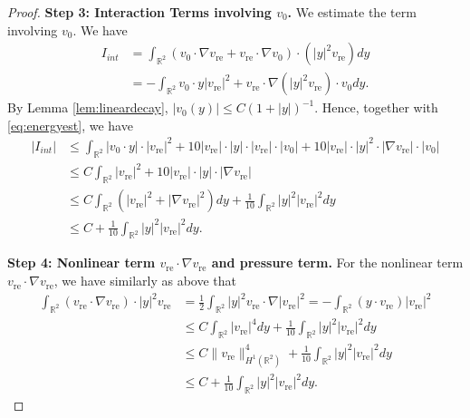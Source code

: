 \documentclass[12pt]{amsart}
\numberwithin{equation}{section}              %
\theoremstyle{remark}
\begin{document}
\begin{proof}
			\textbf{Step 3: Interaction Terms involving $v_0$.}
			We estimate the term involving $v_0$.   We have
			\begin{equation*}
				\begin{aligned}
					I_{int} &= \int_{\mathbb{R}^2} (v_0\cdot\nabla v_{\text{re}} + v_{\text{re}} \cdot \nabla v_0) \cdot (|y|^2 v_{\text{re}}) dy\\
					&= -\int_{\mathbb{R}^2} v_0\cdot y|v_{\text{re}}|^2+v_{\text{re}}\cdot\nabla (|y|^2v_{\text{re}})\cdot v_0 dy.
				\end{aligned}
			\end{equation*}
			By Lemma \ref{lem:lineardecay}, $| v_0(y)| \le C(1+|y|)^{-1}$.
			Hence, together with \eqref{eq:energyest}, we have
            \begin{equation*}
				\begin{aligned}
					|I_{int}| &\leq \int_{\mathbb{R}^2} |v_0\cdot y|  \cdot|v_{\text{re}}|^2 + 10|v_{\text{re}}| \cdot|y|\cdot|v_{\text{re}}| \cdot|v_0| + 10|v_{\text{re}}|\cdot|y|^2 \cdot |\nabla v_{\text{re}}|\cdot |v_0|\\
					& \leq C \int_{\mathbb{R}^2}   |v_{\text{re}}|^2 + 10|v_{\text{re}}| \cdot |y| \cdot |\nabla v_{\text{re}}|\\
					&\leq C\int_{\mathbb{R}^2}   (|v_{\text{re}}|^2 +  |\nabla v_{\text{re}}|^2) dy  + \frac{1}{10}\int_{\mathbb{R}^2}  |y|^2| v_{\text{re}}|^2 dy\\
					&\leq C + \frac{1}{10}\int_{\mathbb{R}^2}  |y|^2| v_{\text{re}}|^2 dy.
				\end{aligned}
			\end{equation*}
		
			
			\textbf{Step 4: Nonlinear term $v_{\text{re}}\cdot \nabla v_{\text{re}}$ and pressure term.}
			For the nonlinear term $v_{\text{re}}\cdot \nabla v_{\text{re}}$, we have similarly as above that
			\begin{equation*}
				\begin{aligned}
					\int_{\mathbb{R}^2} (v_{\text{re}}\cdot \nabla v_{\text{re}})\cdot |y|^2 v_{\text{re}}& = 	\frac{1}{2}\int_{\mathbb{R}^2}|y|^2   v_{\text{re}}\cdot \nabla |v_{\text{re}}|^2 = -	\int_{\mathbb{R}^2}(y\cdot v_{\text{re}}) |v_{\text{re}}|^2\\
					&\leq  C  \int_{\mathbb{R}^2}  | v_{\text{re}}|^4 dy + \frac{1}{10}\int_{\mathbb{R}^2}  |y|^2| v_{\text{re}}|^2 dy\\
					&\leq C  \|v_{\text{re}}\|_{H^1(\mathbb{R}^2)}^4 + \frac{1}{10}\int_{\mathbb{R}^2}  |y|^2| v_{\text{re}}|^2 dy\\
					&\leq  C + \frac{1}{10}\int_{\mathbb{R}^2}  |y|^2| v_{\text{re}}|^2 dy.
				\end{aligned}
			\end{equation*}
			

\end{proof}
\end{document}
